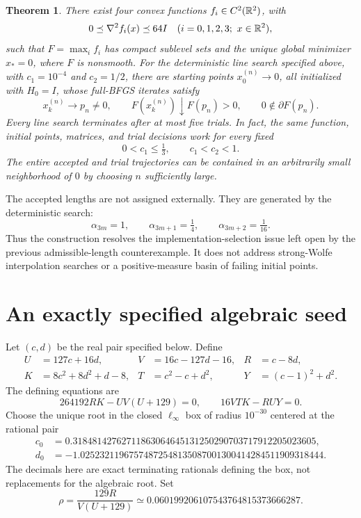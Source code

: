 \documentclass[10pt,oneside,openany]{book}
\newtheorem{theorem}{Theorem}[chapter]
\theoremstyle{remark}\newtheorem{remark}{Remark}[chapter]
\begin{document}
\begin{theorem}\label{D:main}
There exist four convex functions $f_i\in C^2(\mathbb R^2)$, with
\[
 0\preceq\nabla^2 f_i(x)\preceq64I \quad(i=0,1,2,3;\ x\in\mathbb R^2),
\]
such that $F=\max_i f_i$ has compact sublevel sets and the unique global minimizer $x_*=0$, where $F$ is nonsmooth. For the deterministic line search specified above, with $c_1=10^{-4}$ and $c_2=1/2$, there are starting points $x_0^{(n)}\to0$, all initialized with $H_0=I$, whose full-BFGS iterates satisfy
\[
 x_k^{(n)}\longrightarrow p_n\ne0,\qquad
 F(x_k^{(n)})\downarrow F(p_n)>0,\qquad 0\notin\partial F(p_n).
\]
Every line search terminates after at most five trials. In fact, the same function, initial points, matrices, and trial decisions work for every fixed
\[
 0<c_1\le\tfrac13,\qquad c_1<c_2<1.
\]
The entire accepted and trial trajectories can be contained in an arbitrarily small neighborhood of $0$ by choosing $n$ sufficiently large.
\end{theorem}

The accepted lengths are not assigned externally. They are generated by the deterministic search:
\[
 \boxed{\alpha_{3m}=1,\qquad\alpha_{3m+1}=\tfrac14,\qquad\alpha_{3m+2}=\tfrac1{16}.}
\]
Thus the construction resolves the implementation-selection issue left open by the previous admissible-length counterexample. It does not address strong-Wolfe interpolation searches or a positive-measure basin of failing initial points.


\setcounter{section}{1}
\setcounter{theorem}{1}
\setcounter{lemma}{0}
\setcounter{corollary}{0}
\setcounter{proposition}{0}
\setcounter{remark}{0}
\setcounter{equation}{1}
\section{An exactly specified algebraic seed}
Let $(c,d)$ be the real pair specified below. Define
\begin{align*}
 U&=127c+16d,& V&=16c-127d-16,& R&=c-8d,\\
 K&=8c^2+8d^2+d-8,& T&=c^2-c+d^2,& Y&=(c-1)^2+d^2.
\end{align*}
The defining equations are
\begin{equation}\label{D:polys}
 \boxed{264192RK-U V(U+129)=0,\qquad16VTK-RUY=0.}
\end{equation}
Choose the unique root in the closed $\ell_\infty$ box of radius $10^{-30}$ centered at the rational pair
\begin{align*}
 c_0&=0.31848142762711863064645131250290703717912205023605,\\
 d_0&=-1.02523211967574872548135087001300414284511909318444.
\end{align*}
The decimals here are exact terminating rationals defining the box, not replacements for the algebraic root. Set
\begin{equation}\label{D:rho}
 \rho=\frac{129R}{V(U+129)}
       \simeq0.060199206107543764815373666287.
\end{equation}
\end{document}
